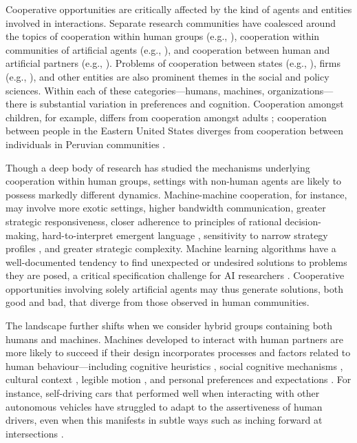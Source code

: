 \documentclass[11pt, a4paper, logo, onecolumn, nonumbering]{deepmind}
\begin{document}
Cooperative opportunities are critically affected by the kind of agents and entities involved in interactions. Separate research communities have coalesced around the topics of cooperation within human groups (e.g., \cite{rand2013human, tomasello2009we}), cooperation within communities of artificial agents (e.g., \cite{leibo2017multi, olfati2007consensus}), and cooperation between human and artificial partners (e.g., \cite{crandall2018cooperating, norman1994might}). Problems of cooperation between states (e.g., \cite{frieden2015world}),  firms (e.g., \cite{parkhe1993strategic}), and other entities are also prominent themes in the social and policy sciences. Within each of these categories---humans, machines, organizations---there is substantial variation in preferences and cognition. Cooperation amongst children, for example, differs from cooperation amongst adults \cite{warneken2018children}; cooperation between people in the Eastern United States diverges from cooperation between individuals in Peruvian communities \cite{henrich2004foundations}.

Though a deep body of research has studied the mechanisms underlying cooperation within human groups, settings with non-human agents are likely to possess markedly different dynamics. Machine-machine cooperation, for instance, may involve more exotic settings, higher bandwidth communication, greater strategic responsiveness, closer adherence to principles of rational decision-making, hard-to-interpret emergent language \cite{kottur2017natural}, sensitivity to narrow strategy profiles \cite{carroll2019utility}, and greater strategic complexity. Machine learning algorithms have a well-documented tendency to find unexpected or undesired solutions to problems they are posed, a critical specification challenge for AI researchers \cite{krakovna2020specification}. Cooperative opportunities involving solely artificial agents may thus generate solutions, both good and bad, that diverge from those observed in human communities.

The landscape further shifts when we consider hybrid groups containing both humans and machines. Machines developed to interact with human partners are more likely to succeed if their design incorporates processes and factors related to human behaviour---including cognitive heuristics \cite{tversky1974judgment}, social cognitive mechanisms \cite{rilling2011neuroscience}, cultural context \cite{takeuchi2000cultural}, legible motion \cite{dragan2013legibility}, and personal preferences and expectations \cite{norman1994might}. For instance, self-driving cars that performed well when interacting with other autonomous vehicles have struggled to adapt to the assertiveness of human drivers, even when this manifests in subtle ways such as inching forward at intersections \cite{schwarting2019social, richtel2015google}. 
\end{document}
